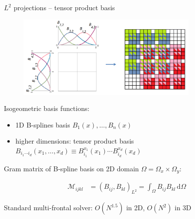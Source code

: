 \documentclass[c]{beamer}
\newcommand{\Prod}[2]{(#1, #2)_{L^2}}
\begin{document}

\begin{frame}{$L^2$ projections -- tensor product basis}

\begin{figure}
  \centering
  \includegraphics[width=0.8\textwidth]{img/2DFEM}
\end{figure}

Isogeometric basis functions:
\begin{itemize}
  \item 1D B-splines basis $B_1(x),\ldots, B_n(x)$
  \item higher dimensions: tensor product basis\\
        $B_{i_1\cdots i_d}(x_1,\ldots,x_d)
        \equiv B^{x_1}_{i_1}(x_1)\cdots B^{x_d}_{i_d}(x_d)$ \\
\end{itemize}
Gram matrix of B-spline basis on 2D domain $\Omega = \Omega_x \times \Omega_y$:

\begin{equation*}
  \begin{aligned}
  \mathcal{M}_{ijkl} &=
  \Prod{B_{ij}}{B_{kl}} =
  \int_\Omega B_{ij}B_{kl}\,\mbox{d}\Omega 
  \end{aligned}
\end{equation*}

Standard multi-frontal solver: $O(N^{1.5})$ in 2D, $O(N^2)$ in 3D

\end{frame}

\end{document}
